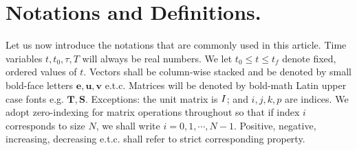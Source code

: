 \section{Notations and Definitions.}
\label{sec:notations}

Let us now introduce the notations that are commonly used in this article. 
Time variables \eg $t, t_0, \tau, T$ will always be  real numbers. We let $t_0 \le t \le t_f$ denote fixed, ordered values of $t$. Vectors shall be column-wise stacked and be denoted by small bold-face letters \ie $\mathbf{e}, \mathbf{u}, \mathbf{v}$  e.t.c. %
Matrices  will  be denoted by bold-math Latin  upper case  fonts  e.g. $\mathbf{T}, \mathbf{S}$.  %
Exceptions: the unit matrix is $I$; and $i,j,k,p$ are indices.  We adopt zero-indexing for matrix operations throughout so that if index $i$ corresponds to size $N$, we shall write $i = 0, 1, \cdots , N-1$. %
Positive, negative, increasing, decreasing  e.t.c. shall refer to strict corresponding property.
%
%
%
%
%
